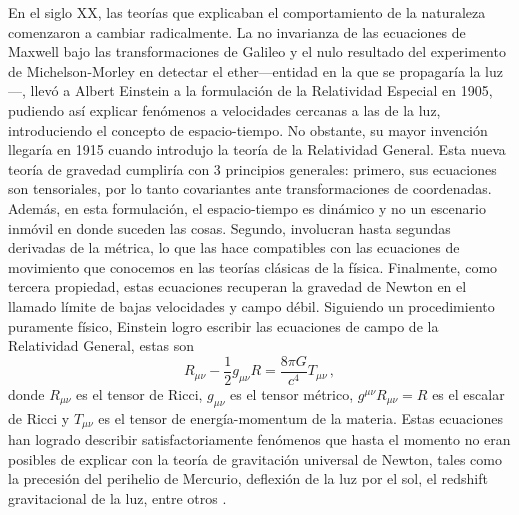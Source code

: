 \documentclass[../Main.tex]{subfiles}
\begin{document}
En el siglo XX, las teorías que explicaban el comportamiento de la naturaleza comenzaron a cambiar radicalmente. La no invarianza de las ecuaciones de Maxwell bajo las transformaciones de Galileo y  el nulo resultado del experimento de Michelson-Morley en detectar el ether---entidad en la que se propagaría la luz---, llevó a Albert Einstein a la formulación de la Relatividad Especial en 1905, pudiendo así explicar fenómenos a velocidades cercanas a las de la luz, introduciendo el concepto de espacio-tiempo. No obstante, su mayor invención llegaría en 1915 cuando introdujo la teoría de la Relatividad General. Esta nueva teoría de gravedad cumpliría con 3 principios generales: primero, sus ecuaciones son tensoriales, por lo tanto covariantes ante transformaciones de coordenadas. Además, en esta formulación, el espacio-tiempo es dinámico y no un escenario inmóvil en donde suceden las cosas. Segundo, involucran hasta segundas derivadas de la métrica, lo que las hace compatibles con las ecuaciones de movimiento que conocemos en las teorías clásicas de la física. Finalmente, como tercera propiedad, estas ecuaciones recuperan la gravedad de Newton en el llamado límite de bajas velocidades y campo débil. Siguiendo un procedimiento puramente físico, Einstein logro escribir las ecuaciones de campo de la Relatividad General, estas son
\begin{equation}\label{eomeinstein}
    R_{\mu\nu}-\frac{1}{2}g_{\mu\nu}R =\frac{8\pi G}{c^4}T_{\mu\nu}\, ,
\end{equation}
donde $R_{\mu\nu}$ es el tensor de Ricci, $g_{\mu\nu}$ es el tensor métrico, $g^{\mu\nu}R_{\mu\nu}=R$ es el escalar de Ricci y $T_{\mu\nu}$ es el tensor de energía-momentum de la materia. Estas ecuaciones han logrado describir satisfactoriamente fenómenos que hasta el momento no eran posibles de explicar con la teoría de gravitación universal de Newton, tales como la precesión del perihelio de Mercurio, deflexión de la luz por el sol, el redshift gravitacional de la luz, entre otros \cite{Will:2014kxa}. 
\end{document}
